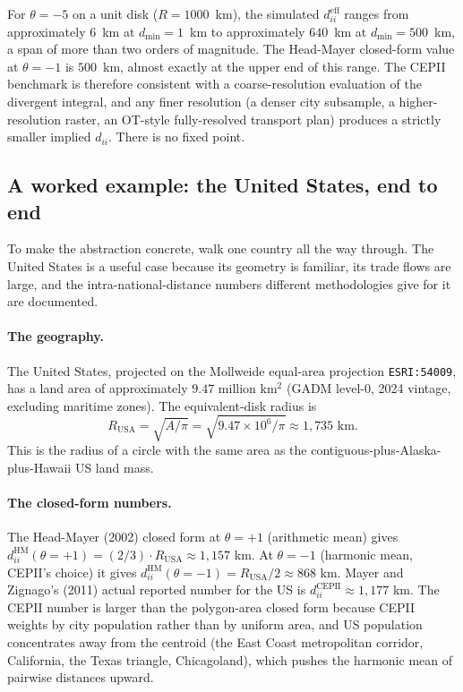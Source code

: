 \documentclass[11pt, letterpaper]{article}
\theoremstyle{definition}
\newcommand{\eff}{\mathrm{eff}}
\newcommand{\dii}{d_{ii}}
\begin{document}
For $\theta = -5$ on a unit disk ($R = 1000$~km), the simulated
$\dii^{\eff}$ ranges from approximately $6$~km at $d_{\min} = 1$~km
to approximately $640$~km at $d_{\min} = 500$~km, a span of more than
two orders of magnitude. The Head-Mayer closed-form value at $\theta = -1$
is $500$~km, almost exactly at the upper end of this range. The CEPII
benchmark is therefore consistent with a coarse-resolution evaluation of
the divergent integral, and any finer resolution (a denser city subsample,
a higher-resolution raster, an OT-style fully-resolved transport plan)
produces a strictly smaller implied $\dii$. There is no fixed point.

\subsection{A worked example: the United States, end to end}
\label{sec:usa-worked-example}

To make the abstraction concrete, walk one country all the way
through. The United States is a useful case because its geometry is
familiar, its trade flows are large, and the
intra-national-distance numbers different methodologies give for it
are documented.

\paragraph{The geography.}
The United States, projected on the Mollweide equal-area projection
\texttt{ESRI:54009}, has a land area of approximately
$9.47$ million km$^2$ (GADM level-0, 2024 vintage, excluding maritime
zones). The equivalent-disk radius is
\[
R_{\text{USA}} = \sqrt{A/\pi} = \sqrt{9.47 \times 10^6 / \pi} \approx 1{,}735 \text{ km}.
\]
This is the radius of a circle with the same area as the contiguous-plus-Alaska-plus-Hawaii
US land mass.

\paragraph{The closed-form numbers.}
The Head-Mayer (2002) closed form at $\theta = +1$ (arithmetic mean)
gives
$d_{ii}^{\text{HM}}(\theta = +1) = (2/3) \cdot R_{\text{USA}} \approx 1{,}157$ km.
At $\theta = -1$ (harmonic mean, CEPII's choice) it gives
$d_{ii}^{\text{HM}}(\theta = -1) = R_{\text{USA}}/2 \approx 868$ km.
Mayer and Zignago's (2011) actual reported number for the US is
$d_{ii}^{\text{CEPII}} \approx 1{,}177$ km. The CEPII number is
larger than the polygon-area closed form because CEPII weights by
city population rather than by uniform area, and US population
concentrates away from the centroid (the East Coast metropolitan
corridor, California, the Texas triangle, Chicagoland), which pushes
the harmonic mean of pairwise distances upward.
\end{document}

